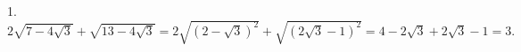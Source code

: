 1. $ 2\sqrt{7-4\sqrt{3}}+\sqrt{13-4\sqrt{3}} = 2\sqrt{(2 - \sqrt{3})^2} + \sqrt{(2\sqrt{3} - 1)^2} = 4 - 2\sqrt{3} + 2\sqrt{3} - 1 = 3.$\\
